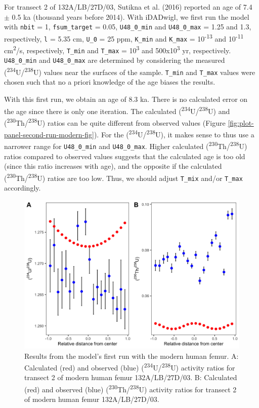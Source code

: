 \documentclass[]{elsarticle} %
\begin{document}
For transect 2 of 132A/LB/27D/03, Sutikna et al. (2016) reported an age of 7.4 \(\pm\) 0.5 ka (thousand years before 2014). With iDADwigl, we first run the model with \texttt{nbit} = 1, \texttt{fsum\_target} = 0.05, \texttt{U48\_0\_min} and \texttt{U48\_0\_max} = 1.25 and 1.3, respectively, \texttt{l} = 5.35 cm, \texttt{U\_0} = 25 ppm, \texttt{K\_min} and \texttt{K\_max} = 10\textsuperscript{-13} and 10\textsuperscript{-11} cm\textsuperscript{2}/s, respectively, \texttt{T\_min} and \texttt{T\_max} = 10\textsuperscript{3} and 500x10\textsuperscript{3} yr, respectively. \texttt{U48\_0\_min} and \texttt{U48\_0\_max} are determined by considering the measured (\textsuperscript{234}U/\textsuperscript{238}U) values near the surfaces of the sample. \texttt{T\_min} and \texttt{T\_max} values were chosen such that no a priori knowledge of the age biases the results.

With this first run, we obtain an age of 8.3 ka. There is no calculated error on the age since there is only one iteration. The calculated (\textsuperscript{234}U/\textsuperscript{238}U) and (\textsuperscript{230}Th/\textsuperscript{238}U) ratios can be quite different from observed values (Figure \ref{fig:plot-panel-second-run-modern-fig}). For the (\textsuperscript{234}U/\textsuperscript{238}U), it makes sense to thus use a narrower range for \texttt{U48\_0\_min} and \texttt{U48\_0\_max}. Higher calculated (\textsuperscript{230}Th/\textsuperscript{238}U) ratios compared to observed values suggests that the calculated age is too old (since this ratio increases with age), and the opposite if the calculated (\textsuperscript{230}Th/\textsuperscript{238}U) ratios are too low. Thus, we should adjust \texttt{T\_mix} and/or \texttt{T\_max} accordingly.



\begin{figure}
\includegraphics[width=0.95\linewidth]{figures/plot-panel-first-run-modern} \caption{Results from the model's first run with the modern human femur. A: Calculated (red) and observed (blue) (\textsuperscript{234}U/\textsuperscript{238}U) activity ratios for transect 2 of modern human femur 132A/LB/27D/03. B: Calculated (red) and observed (blue) (\textsuperscript{230}Th/\textsuperscript{238}U) activity ratios for transect 2 of modern human femur 132A/LB/27D/03.}\label{fig:plot-panel-first-run-modern-fig}
\end{figure}
\end{document}
